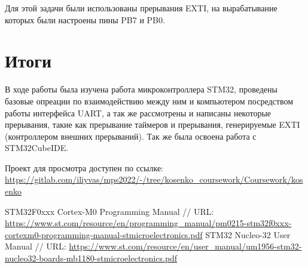 Для этой задачи были использованы прерывания EXTI, на вырабатывание которых были настроены пины PB7 и PB0. 
\newpage

\section{Итоги}
В ходе работы была изучена работа микроконтроллера STM32, проведены базовые опреации по взаимодействию
между ним и компьютером посредством работы интерфейса UART, а так же рассмотрены и написаны некоторые прерывания,
такие как прерывание таймеров и прерывания, генерируемые EXTI (контроллером внешних прерываний). Так же 
была освоена работа с STM32CubeIDE.

Проект для просмотра доступен по ссылке: 
\url{https://gitlab.com/iliyvas/mps2022/-/tree/kosenko_coursework/Coursework/kosenko}

\begin{thebibliography}{}
STM32F0xxx Cortex-M0 Programming Manual 
// URL: \url{https://www.st.com/resource/en/programming_manual/pm0215-stm32f0xxx-cortexm0-programming-manual-stmicroelectronics.pdf}
STM32 Nucleo-32 User Manual
// URL: \url{https://www.st.com/resource/en/user_manual/um1956-stm32-nucleo32-boards-mb1180-stmicroelectronics.pdf}
\end{thebibliography}

